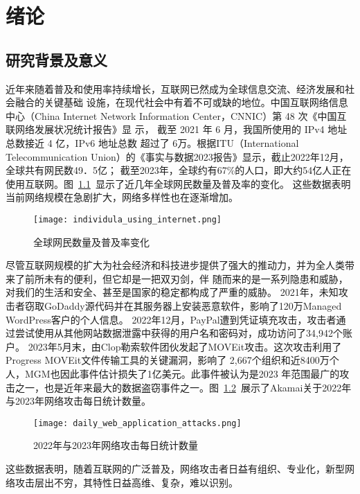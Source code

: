 \chapter{绪论}
\label{cha:overview}

\section{研究背景及意义}

近年来随着普及和使用率持续增长，互联网已然成为全球信息交流、经济发展和社会融合的关键基础
设施，在现代社会中有着不可或缺的地位。中国互联网络信息中心（China Internet 
Network Information Center，CNNIC）第 48 次《中国互联网络发展状况统计报告》显
示\cite{cnnic2021}， 截至 2021 年 6 月，我国所使用的 IPv4 地址总数接近 4 亿，IPv6 地址总数
超过了 6万。根据ITU（International Telecommunication Union）的《事实与数据2023报告》显示\cite{itu2023}，截止2022年12月，全球共有网民数49．5亿；
截至2023年，全球约有67\%的人口，即大约54亿人正在使用互联网。图~\ref{fig:individula_using_internet}~显示了近几年全球网民数量及普及率的变化。
这些数据表明当前网络规模在急剧扩大，网络多样性也在逐渐增加。
\begin{figure}[htbp]
    \centering
    \texttt{[image: individula\_using\_internet.png]}
    \caption{全球网民数量及普及率变化\cite{fig-itu2023}}
    \label{fig:individula_using_internet}
\end{figure} 


尽管互联网规模的扩大为社会经济和科技进步提供了强大的推动力，并为全人类带来了前所未有的便利，但它却是一把双刃剑，伴
随而来的是一系列隐患和威胁，对我们的生活和安全、甚至是国家的稳定都构成了严重的威胁。
2021年，未知攻击者窃取GoDaddy源代码并在其服务器上安装恶意软件，影响了120万Managed WordPress客户的个人信息。
2022年12月，PayPal遭到凭证填充攻击，攻击者通过尝试使用从其他网站数据泄露中获得的用户名和密码对，成功访问了34,942个账户。
2023年5月末，由Clop勒索软件团伙发起了MOVEit攻击。这次攻击利用了Progress MOVEit文件传输工具的关键漏洞，影响了
2,667个组织和近8400万个人，MGM也因此事件估计损失了1亿美元​。此事件被认为是2023
年范围最广的攻击之一，也是近年来最大的数据盗窃事件之一。图~\ref{fig:daily_web_application_attacks}~展示了Akamai关于2022年
与2023年网络攻击每日统计数量。
\begin{figure}[htbp]
  \centering
  \texttt{[image: daily\_web\_application\_attacks.png]}
  \caption{2022年与2023年网络攻击每日统计数量\cite{akamai}}
  \label{fig:daily_web_application_attacks}
\end{figure}
这些数据表明，随着互联网的广泛普及，网络攻击者日益有组织、专业化，新型网络攻击层出不穷，其特性日益高维、复杂，难以识别。\par

